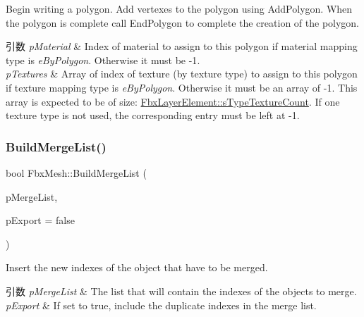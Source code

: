 Begin writing a polygon. Add vertexes to the polygon using Add\+Polygon. When the polygon is complete call End\+Polygon to complete the creation of the polygon. 
\begin{DoxyParams}{引数}
{\em p\+Material} & Index of material to assign to this polygon if material mapping type is {\itshape e\+By\+Polygon}. Otherwise it must be {\ttfamily -\/1}. \\
\hline
{\em p\+Textures} & Array of index of texture (by texture type) to assign to this polygon if texture mapping type is {\itshape e\+By\+Polygon}. Otherwise it must be an array of {\ttfamily -\/1}. This array is expected to be of size\+: \hyperlink{class_fbx_layer_element_ae7a09ea6aa90f96d37a9e161b9f54094}{Fbx\+Layer\+Element\+::s\+Type\+Texture\+Count}. If one texture type is not used, the corresponding entry must be left at {\ttfamily -\/1}. \\
\hline
\end{DoxyParams}
\mbox{\label{class_fbx_mesh_a4f8376d3f9476bf4c3e7d5db4ac1fa9f}} 
\subsubsection{\texorpdfstring{Build\+Merge\+List()}{BuildMergeList()}}
{\footnotesize\ttfamily bool Fbx\+Mesh\+::\+Build\+Merge\+List (\begin{DoxyParamCaption}\item[{\hyperlink{class_fbx_array}{Fbx\+Array}$<$ int $>$ \&}]{p\+Merge\+List,  }\item[{bool}]{p\+Export = {\ttfamily false} }\end{DoxyParamCaption})}

Insert the new indexes of the object that have to be merged. 
\begin{DoxyParams}{引数}
{\em p\+Merge\+List} & The list that will contain the indexes of the objects to merge. \\
\hline
{\em p\+Export} & If set to {\ttfamily true}, include the duplicate indexes in the merge list. \\
\hline
\end{DoxyParams}
\mbox{\label{class_fbx_mesh_af1c0926731661cbdc52ec90032462ef2}} 
